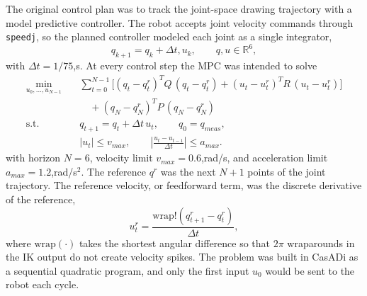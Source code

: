 \documentclass[11pt]{article}
\begin{document}
The original control plan was to track the joint-space drawing trajectory with a model predictive controller. The robot accepts joint velocity commands through \texttt{speedj}, so the planned controller modeled each joint as a single integrator,
\begin{equation}
q_{k+1} = q_k + \Delta t , u_k, \qquad q, u \in \mathbb{R}^6,
\end{equation}
with $\Delta t = 1/75$,s. At every control step the MPC was intended to solve
\begin{equation}
\begin{aligned}
  \min_{u_0, \dots, u_{N-1}} \quad
  & \sum_{t=0}^{N-1} \Big[
      (q_t - q_t^r)^T Q \,(q_t - q_t^r)
      + (u_t - u_t^r)^T R \,(u_t - u_t^r)
    \Big] \\
  & \quad + (q_N - q_N^r)^T P \,(q_N - q_N^r) \\
  \text{s.t.} \quad
  & q_{t+1} = q_t + \Delta t\,u_t, \qquad q_0 = q_{meas}, \\
  & |u_t| \le v_{max}, \qquad
    \left| \frac{u_t - u_{t-1}}{\Delta t} \right| \le a_{max}.
\end{aligned}
\end{equation}
  with horizon $N = 6$, velocity limit $v_{max} = 0.6$,rad/s, and acceleration limit $a_{max} = 1.2$,rad/s$^2$. The reference $q^r$ was the next $N{+}1$ points of the joint trajectory. The reference velocity, or feedforward term, was the discrete derivative of the reference,
  \begin{equation}
  u_t^r = \frac{\mathrm{wrap}!\left(q_{t+1}^r - q_t^r\right)}{\Delta t},
  \end{equation}
  where $\mathrm{wrap}(\cdot)$ takes the shortest angular difference so that $2\pi$ wraparounds in the IK output do not create velocity spikes. The problem was built in CasADi as a sequential quadratic program, and only the first input $u_0$ would be sent to the robot each cycle.
\end{document}
